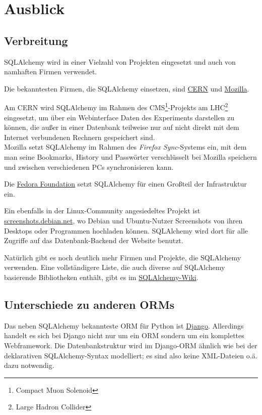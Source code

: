 \chapter{Ausblick}

\section{Verbreitung}

SQLAlchemy wird in einer Vielzahl von Projekten eingesetzt und auch von
namhaften Firmen verwendet.

Die bekanntesten Firmen, die SQLAlchemy einsetzen, sind
\href{http://www.cern.ch}{CERN} und
\href{http://www.mozilla.com}{Mozilla}.

Am CERN wird SQLAlchemy im Rahmen des CMS\footnote{Compact Muon
Solenoid}-Projekts am LHC\footnote{Large Hadron Collider} eingesetzt, um über
ein Webinterface Daten des Experiments darstellen zu können, die außer in einer
Datenbank teilweise nur auf nicht direkt mit dem Internet verbundenen Rechnern
gespeichert sind. \\
Mozilla setzt SQLAlchemy im Rahmen des \emph{Firefox Sync}-Systems ein, mit dem
man seine Bookmarks, History und Passwörter verschlüsselt bei Mozilla speichern
und zwischen verschiedenen PCs synchronisieren kann.

Die \href{http://fedoraproject.org/wiki/Infrastructure/Services}{Fedora
Foundation} setzt SQLAlchemy für einen Großteil der Infrastruktur ein.

Ein ebenfalls in der Linux-Community angesiedeltes Projekt ist
\href{http://screenshots.debian.net/}{screenshots.debian.net}, wo Debian
und Ubuntu-Nutzer Screenshots von ihren Desktops oder Programmen hochladen
können. SQLAlchemy wird dort für alle Zugriffe auf das Datenbank-Backend der
Website benutzt.

Natürlich gibt es noch deutlich mehr Firmen und Projekte, die SQLAlchemy
verwenden. Eine vollständigere Liste, die auch diverse auf SQLAlchemy basierende
Bibliotheken enthält, gibt es im
\href{http://www.sqlalchemy.org/trac/wiki/SAApps}{SQLAlchemy-Wiki}.


\section{Unterschiede zu anderen ORMs}

Das neben SQLAlchemy bekannteste ORM für Python ist
\href{http://www.djangoproject.com/}{Django}. Allerdings handelt es sich bei
Django nicht nur um ein ORM sondern um ein komplettes Webframework. Die
Datenbankstruktur wird im Django-ORM ähnlich wie bei der deklarativen
SQLAlchemy-Syntax modelliert; es sind also keine XML-Dateien o.ä. dazu
notwendig.

